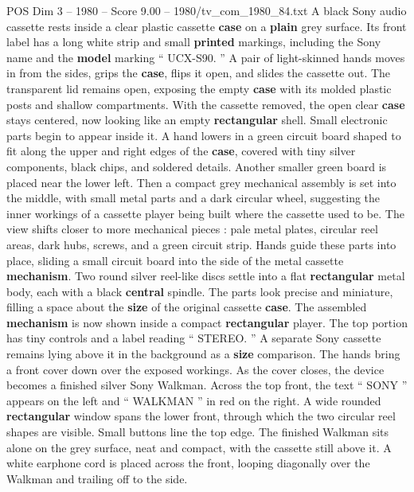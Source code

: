 \begin{textsample}{POS Dim 3 – 1980 – Score 9.00 – 1980/tv\_com\_1980\_84.txt}  \label{ex:f3_pos_044}
A black Sony audio cassette rests inside a clear plastic cassette \textbf{case} on a \textbf{plain} grey surface.
Its front label has a long white strip and small \textbf{printed} markings, including the Sony name and the \textbf{model} marking “ UCX-S90. ” A pair of light-skinned hands moves in from the sides, grips the \textbf{case}, flips it open, and slides the cassette out.
The transparent lid remains open, exposing the empty \textbf{case} with its molded plastic posts and shallow compartments.
With the cassette removed, the open clear \textbf{case} stays centered, now looking like an empty \textbf{rectangular} shell.
Small electronic parts begin to appear inside it.
A hand lowers in a green circuit board shaped to fit along the upper and right edges of the \textbf{case}, covered with tiny silver components, black chips, and soldered details.
Another smaller green board is placed near the lower left.
Then a compact grey mechanical assembly is set into the middle, with small metal parts and a dark circular wheel, suggesting the inner workings of a cassette player being built where the cassette used to be.
The view shifts closer to more mechanical pieces : pale metal plates, circular reel areas, dark hubs, screws, and a green circuit strip.
Hands guide these parts into place, sliding a small circuit board into the side of the metal cassette \textbf{mechanism}.
Two round silver reel-like discs settle into a flat \textbf{rectangular} metal body, each with a black \textbf{central} spindle.
The parts look precise and miniature, filling a space about the \textbf{size} of the original cassette \textbf{case}.
The assembled \textbf{mechanism} is now shown inside a compact \textbf{rectangular} player.
The top portion has tiny controls and a label reading “ STEREO. ” A separate Sony cassette remains lying above it in the background as a \textbf{size} comparison.
The hands bring a front cover down over the exposed workings.
As the cover closes, the device becomes a finished silver Sony Walkman.
Across the top front, the text “ SONY ” appears on the left and “ WALKMAN ” in red on the right.
A wide rounded \textbf{rectangular} window spans the lower front, through which the two circular reel shapes are visible.
Small buttons line the top edge.
The finished Walkman sits alone on the grey surface, neat and compact, with the cassette still above it.
A white earphone cord is placed across the front, looping diagonally over the Walkman and trailing off to the side.

\end{textsample}
